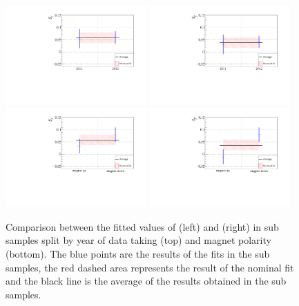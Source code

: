 \begin{figure}[tbp]
    \centering
    \includegraphics[width=0.48\textwidth]{10TimeFit/figs/Sf_splits_Year.pdf}
    \includegraphics[width=0.48\textwidth]{10TimeFit/figs/Sfbar_splits_Year.pdf}\\
    \includegraphics[width=0.48\textwidth]{10TimeFit/figs/Sf_splits_Polarity.pdf}
    \includegraphics[width=0.48\textwidth]{10TimeFit/figs/Sfbar_splits_Polarity.pdf}
    \caption{Comparison between the fitted values of \Sf (left) and \Sfbar (right) in sub samples split by year of data taking (top) and magnet polarity (bottom).
    The blue points are the results of the fits in the sub samples, the red dashed area represents the result of the nominal fit and the black line is the average of the results obtained in the sub samples.}
    \label{fig:splitByDataTaking}
\end{figure}


